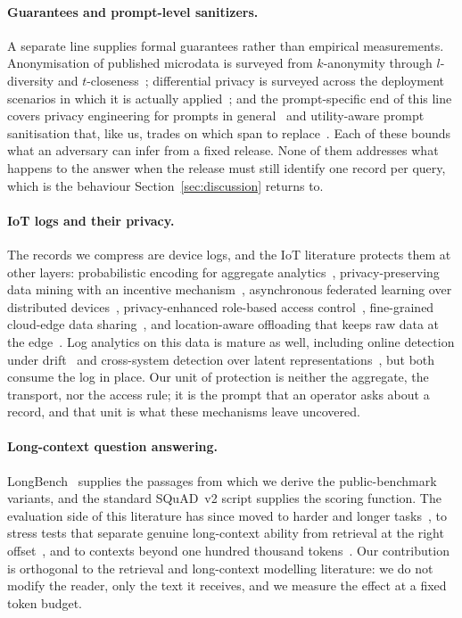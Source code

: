 \paragraph{Guarantees and prompt-level sanitizers.}
A separate line supplies formal guarantees rather than empirical measurements. Anonymisation
of published microdata is surveyed from $k$-anonymity through $l$-diversity and
$t$-closeness~\cite{carvalho-microdata-2023}; differential privacy is surveyed across the
deployment scenarios in which it is actually applied~\cite{zhao-dp-2024}; and the
prompt-specific end of this line covers privacy engineering for prompts in
general~\cite{edemacu-prompt-2025} and utility-aware prompt sanitisation that, like us,
trades on which span to replace~\cite{shen-prosan-2026}. Each of these bounds what an
adversary can infer from a fixed release. None of them addresses what happens to the answer
when the release must still identify one record per query, which is the behaviour
Section~\ref{sec:discussion} returns to.

\paragraph{IoT logs and their privacy.}
The records we compress are device logs, and the IoT literature protects them at other
layers: probabilistic encoding for aggregate analytics~\cite{zaman-encode-2024},
privacy-preserving data mining with an incentive mechanism~\cite{gao-datamining-2024},
asynchronous federated learning over distributed devices~\cite{yan-fedlearn-2023},
privacy-enhanced role-based access control~\cite{zhang-rbac-2025}, fine-grained cloud-edge
data sharing~\cite{sun-sharing-2025}, and location-aware offloading that keeps raw data at the
edge~\cite{wang-offload-2024}. Log analytics on this data is mature as well, including online
detection under drift~\cite{tian-omlog-2025} and cross-system detection over latent
representations~\cite{zhou-logdlr-2025}, but both consume the log in place. Our unit of
protection is neither the aggregate, the transport, nor the access rule; it is the prompt that
an operator asks about a record, and that unit is what these mechanisms leave uncovered.

\paragraph{Long-context question answering.}
LongBench~\cite{longbench} supplies the passages from which we derive the public-benchmark
variants, and the standard SQuAD~v2 script supplies the scoring function. The evaluation side
of this literature has since moved to harder and longer tasks~\cite{bai-longbenchv2-2025}, to
stress tests that separate genuine long-context ability from retrieval at the right
offset~\cite{hsieh-ruler-2024,yen-helmet-2025}, and to contexts beyond one hundred thousand
tokens~\cite{zhang-infinitebench-2024}. Our contribution is orthogonal to the retrieval and
long-context modelling literature: we do not modify the reader, only the text it receives, and
we measure the effect at a fixed token budget.

